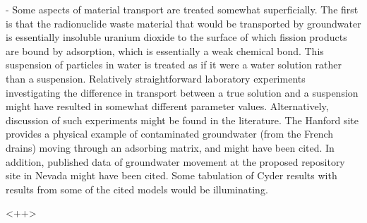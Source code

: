 \documentclass[answers,12pt]{exam}
\begin{document}
\begin{questions}
\question   - Some aspects of material transport are treated somewhat superficially. The
first is that the radionuclide waste material that would be transported by
groundwater is essentially insoluble uranium dioxide to the surface of which
fission products are bound by adsorption, which is essentially a weak chemical
bond.  This suspension of particles in water is treated as if it were a water
solution rather than a suspension.  Relatively straightforward laboratory
experiments investigating the difference in transport between a true solution
and a suspension might have resulted in somewhat different parameter values.
Alternatively, discussion of such experiments might be found in the literature.
The Hanford site provides a physical example of contaminated groundwater (from
the French drains) moving through an adsorbing matrix, and might have been
cited. In addition, published data of groundwater movement at the proposed
repository site in Nevada might have been cited.  Some tabulation of Cyder
results with results from some of the cited models would be illuminating. 
\begin{solution}
<++>
\end{solution}

\end{questions}
  
\end{document}
